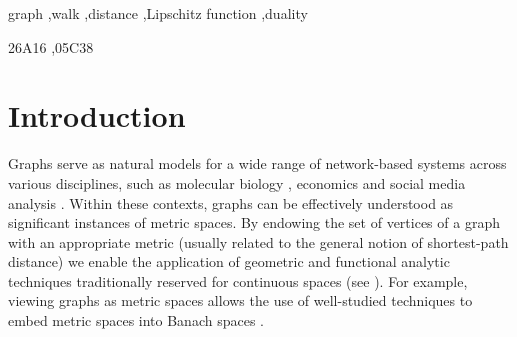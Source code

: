 \documentclass[preprint,12pt]{elsarticle}
\begin{document}
\begin{frontmatter}

\begin{keyword}
graph \sep walk \sep  distance \sep Lipschitz function \sep duality

\MSC 26A16 \sep 05C38

\end{keyword}

\end{frontmatter}




\section{Introduction}

Graphs serve as natural models for a wide range of network-based systems across various disciplines, such as molecular biology \cite{liu}, economics \cite{zhou} and social media analysis \cite{wang}. Within these contexts, graphs can be effectively understood as significant instances of metric spaces. By endowing the set of vertices of a graph with an appropriate metric (usually related to the general notion of shortest-path distance) we enable the application of geometric and functional analytic techniques traditionally reserved for continuous spaces (see \cite{bani, bour, weaver2018lipschitz}). For example, viewing graphs as metric spaces allows the use of well-studied techniques to embed metric spaces into Banach spaces \cite{weaver2018lipschitz}. 
\end{document}
